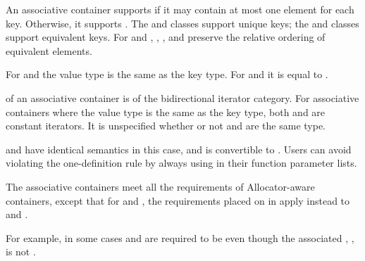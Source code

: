 \documentclass{wg21}
\begin{document}
\pnum
An associative container supports  if it may contain at
most one element for each key. Otherwise, it supports .
The  and  classes support unique keys; the 
and  classes support equivalent keys.
For  and ,
, , and  preserve the relative ordering
of equivalent elements.

\pnum
For  and  the value type is the same as the key type.
For  and  it is equal to .

\pnum
{}
of an associative container is of the bidirectional iterator category.
For associative containers where the value type is the same as the key type, both
and
are constant iterators. It is unspecified whether or not
and
are the same type.
\begin{note}
     and  have identical semantics in this case, and  is convertible to . Users can avoid violating the one-definition rule by always using  in their function parameter lists.
\end{note}

\pnum
The associative containers meet all the requirements of Allocator-aware
containers, except that for
 and , the requirements placed on 
in  apply instead to 
and .
\begin{note}
    For example, in some cases  and 
    are required to be  even though the associated
    , , is not
    .
\end{note}
\end{document}
